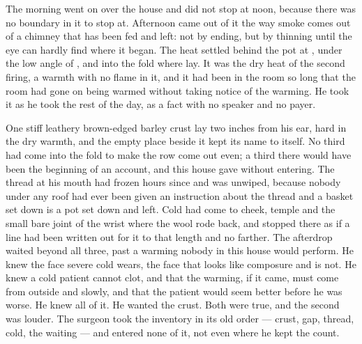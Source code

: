 The morning went on over the house and did not stop at noon, because there was no boundary in it to stop at. Afternoon came out of it the way smoke comes out of a chimney that has been fed and left: not by ending, but by thinning until the eye can hardly find where it began. The heat settled behind the pot at , under the low angle of , and into the fold where  lay. It was the dry heat of the second firing, a warmth with no flame in it, and it had been in the room so long that the room had gone on being warmed without taking notice of the warming. He took it as he took the rest of the day, as a fact with no speaker and no payer.

One stiff leathery brown-edged barley crust lay two inches from his ear, hard in the dry warmth, and the empty place beside it kept its name to itself. No third had come into the fold to make the row come out even; a third there would have been the beginning of an account, and this house gave without entering. The thread at his mouth had frozen hours since and was unwiped, because nobody under any roof had ever been given an instruction about the thread and a basket set down is a pot set down and left. Cold had come to cheek, temple and the small bare joint of the wrist where the wool rode back, and stopped there as if a line had been written out for it to that length and no farther. The afterdrop waited beyond all three, past a warming nobody in this house would perform. He knew the face severe cold wears, the face that looks like composure and is not. He knew a cold patient cannot clot, and that the warming, if it came, must come from outside and slowly, and that the patient would seem better before he was worse. He knew all of it. He wanted the crust. Both were true, and the second was louder. The surgeon took the inventory in its old order --- crust, gap, thread, cold, the waiting --- and entered none of it, not even where he kept the count.

